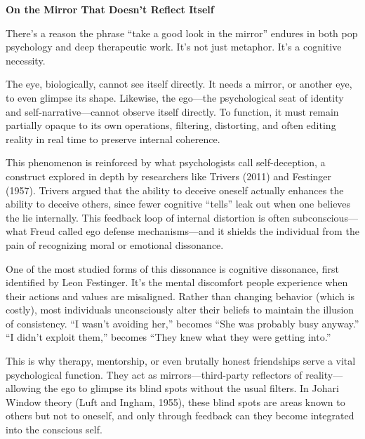 \begin{PsychologicalSidebar}{\textbf{On the Mirror That Doesn't Reflect Itself}}

  There’s a reason the phrase ``take a good look in the mirror'' endures in both pop psychology and deep therapeutic 
  work. It’s not just metaphor. It’s a cognitive necessity.

\medskip
  
  The eye, biologically, cannot see itself directly. It needs a mirror, or another eye, to even glimpse its shape. 
  Likewise, the ego—the psychological seat of identity and self-narrative—cannot observe itself directly. To function, 
  it must remain partially opaque to its own operations, filtering, distorting, and often editing reality in real 
  time to preserve internal coherence.

\medskip
  
  This phenomenon is reinforced by what psychologists call self-deception, a construct explored in depth by researchers 
  like Trivers (2011) and Festinger (1957). Trivers argued that the ability to deceive oneself actually enhances the 
  ability to deceive others, since fewer cognitive ``tells'' leak out when one believes the lie internally. This feedback 
  loop of internal distortion is often subconscious—what Freud called ego defense mechanisms—and it shields the 
  individual from the pain of recognizing moral or emotional dissonance.

\medskip
  
  One of the most studied forms of this dissonance is cognitive dissonance, first identified by Leon Festinger. It’s the 
  mental discomfort people experience when their actions and values are misaligned. Rather than changing behavior (which 
  is costly), most individuals unconsciously alter their beliefs to maintain the illusion of consistency. ``I wasn’t 
  avoiding her,'' becomes ``She was probably busy anyway.'' ``I didn’t exploit them,'' becomes ``They knew what they 
  were getting into.''

\medskip
  
  This is why therapy, mentorship, or even brutally honest friendships serve a vital psychological function. They act 
  as mirrors—third-party reflectors of reality—allowing the ego to glimpse its blind spots without the usual filters. 
  In Johari Window theory (Luft and Ingham, 1955), these blind spots are areas known to others but not to oneself, and 
  only through feedback can they become integrated into the conscious self.


\end{PsychologicalSidebar}
